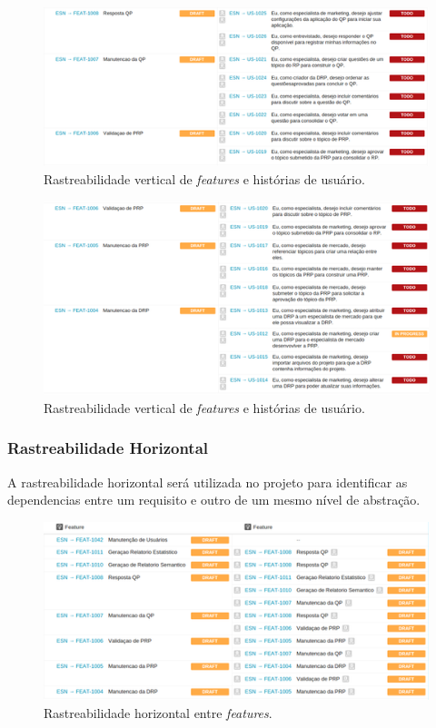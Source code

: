		\begin{figure}[!htp]
			\centering
			\includegraphics{imagens/featus2.png}
			\caption{Rastreabilidade vertical de \textit{features} e histórias de usuário.}
			\label{imagem}
		\end{figure}

		\begin{figure}[!htp]
			\centering
			\includegraphics{imagens/featus3.png}
			\caption{Rastreabilidade vertical de \textit{features} e histórias de usuário.}
			\label{imagem}
		\end{figure}

	\newpage
	\subsubsection{Rastreabilidade Horizontal}
	A rastreabilidade horizontal será utilizada no projeto para identificar as dependencias entre um requisito e outro de um mesmo nível de abstração.\\

		\begin{figure}[!htp]
			\centering
			\includegraphics{imagens/featfeat.png}
			\caption{Rastreabilidade horizontal entre \textit{features}.}
			\label{imagem}
		\end{figure}